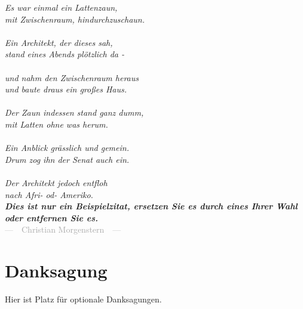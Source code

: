 
\begin{flushright}{\slshape
Es war einmal ein Lattenzaun,\\
mit Zwischenraum, hindurchzuschaun.\\
~\\
Ein Architekt, der dieses sah,\\
stand eines Abends plötzlich da -\\
~\\
und nahm den Zwischenraum heraus\\
und baute draus ein großes Haus.\\
~\\
Der Zaun indessen stand ganz dumm,\\
mit Latten ohne was herum.\\
~\\
Ein Anblick grässlich und gemein.\\
Drum zog ihn der Senat auch ein.\\
~\\
Der Architekt jedoch entfloh\\
nach Afri- od- Ameriko.\\
\textbf{Dies ist nur ein Beispielzitat, ersetzen Sie es durch eines Ihrer Wahl oder entfernen Sie es.}} \\ \medskip
\textcolor{darkgray}{---~~Christian Morgenstern~~---}
\end{flushright}

\bigskip

\begingroup
\let\clearpage\relax
\let\cleardoublepage\relax
\let\cleardoublepage\relax
\chapter*{Danksagung}
Hier ist Platz für optionale Danksagungen.


\endgroup
